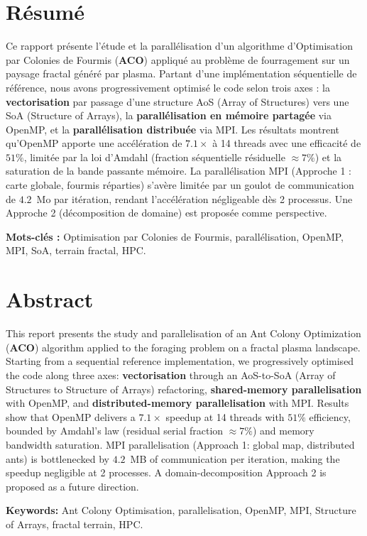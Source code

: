 \chapter*{Résumé}

Ce rapport présente l'étude et la parallélisation d'un algorithme d'Optimisation par
Colonies de Fourmis (\textbf{ACO}) appliqué au problème de fourragement sur un paysage
fractal généré par plasma. Partant d'une implémentation séquentielle de référence, nous
avons progressivement optimisé le code selon trois axes : la \textbf{vectorisation} par
passage d'une structure AoS (Array of Structures) vers une SoA (Structure of Arrays),
la \textbf{parallélisation en mémoire partagée} via OpenMP, et la
\textbf{parallélisation distribuée} via MPI. Les résultats montrent qu'OpenMP apporte
une accélération de $7.1\times$ à 14 threads avec une efficacité de $51\%$,
limitée par la loi d'Amdahl (fraction séquentielle résiduelle $\approx 7\%$) et la
saturation de la bande passante mémoire. La parallélisation MPI (Approche 1 : carte
globale, fourmis réparties) s'avère limitée par un goulot de communication de $4.2$~Mo
par itération, rendant l'accélération négligeable dès 2 processus. Une Approche 2
(décomposition de domaine) est proposée comme perspective.

\medskip
\noindent \textbf{Mots-clés :} Optimisation par Colonies de Fourmis, parallélisation,
OpenMP, MPI, SoA, terrain fractal, HPC.

\newpage

\chapter*{Abstract}

This report presents the study and parallelisation of an Ant Colony Optimization
(\textbf{ACO}) algorithm applied to the foraging problem on a fractal plasma landscape.
Starting from a sequential reference implementation, we progressively optimised the code
along three axes: \textbf{vectorisation} through an AoS-to-SoA (Array of Structures to
Structure of Arrays) refactoring, \textbf{shared-memory parallelisation} with OpenMP,
and \textbf{distributed-memory parallelisation} with MPI. Results show that OpenMP
delivers a $7.1\times$ speedup at 14 threads with $51\%$ efficiency, bounded by
Amdahl's law (residual serial fraction $\approx 7\%$) and memory bandwidth saturation.
MPI parallelisation (Approach 1: global map, distributed ants) is bottlenecked by
$4.2$~MB of communication per iteration, making the speedup negligible at 2 processes.
A domain-decomposition Approach 2 is proposed as a future direction.

\medskip
\noindent \textbf{Keywords:} Ant Colony Optimisation, parallelisation, OpenMP, MPI,
Structure of Arrays, fractal terrain, HPC.

\newpage

